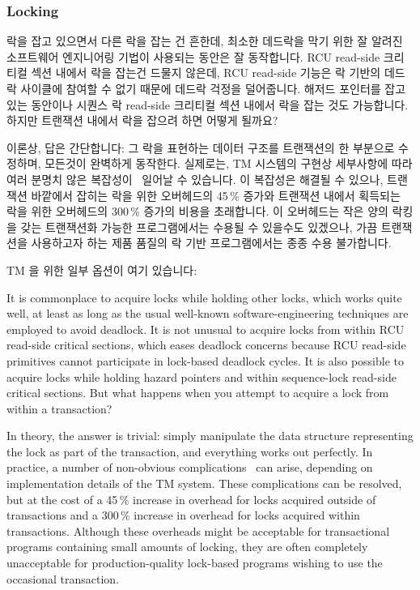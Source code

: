 \subsubsection{Locking}
\label{sec:future:Locking}

락을 잡고 있으면서 다른 락을 잡는 건 흔한데, 최소한 데드락을 막기 위한 잘
알려진 소프트웨어 엔지니어링 기법이 사용되는 동안은 잘 동작합니다.
RCU read-side 크리티컬 섹션 내에서 락을 잡는건 드물지 않은데, RCU read-side
기능은 락 기반의 데드락 사이클에 참여할 수 없기 때문에 데드락 걱정을
덜어줍니다.
해저드 포인터를 잡고 있는 동안이나 시퀀스 락 read-side 크리티컬 섹션 내에서
락을 잡는 것도 가능합니다.
하지만 트랜잭션 내에서 락을 잡으려 하면 어떻게 될까요?

이론상, 답은 간단합니다: 그 락을 표현하는 데이터 구조를 트랜잭션의 한 부분으로
수정하며, 모든것이 완벽하게 동작한다.
실제로는, TM 시스템의 구현상 세부사항에 따라 여러 분명치 않은
복잡성이~\cite{Volos2008TRANSACT} 일어날 수 있습니다.
이 복잡성은 해결될 수 있으나, 트랜잭션 바깥에서 잡히는 락을 위한 오버헤드의
45\,\% 증가와 트랜잭션 내에서 획득되는 락을 위한 오버헤드의 300\,\% 증가의
비용을 초래합니다.
이 오버헤드는 작은 양의 락킹을 갖는 트랜잭션화 가능한 프로그램에서는 수용될 수
있을수도 있겠으나, 가끔 트랜잭션을 사용하고자 하는 제품 품질의 락 기반
프로그램에서는 종종 수용 불가합니다.

TM 을 위한 일부 옵션이 여기 있습니다:

\iffalse

It is commonplace to acquire locks while holding other locks, which works
quite well, at least as long as the usual well-known software-engineering
techniques are employed to avoid deadlock.
It is not unusual to acquire locks from within RCU read-side critical
sections, which eases deadlock concerns because RCU read-side primitives
cannot participate in lock-based deadlock cycles.
It is also possible to acquire locks while holding hazard pointers and
within sequence-lock read-side critical sections.
But what happens when you attempt to acquire a lock from within a transaction?

In theory, the answer is trivial: simply manipulate the data structure
representing the lock as part of the transaction, and everything works
out perfectly.
In practice, a number of non-obvious complications~\cite{Volos2008TRANSACT}
can arise, depending on implementation details of the TM system.
These complications can be resolved, but at the cost of a 45\,\% increase in
overhead for locks acquired outside of transactions and a 300\,\% increase
in overhead for locks acquired within transactions.
Although these overheads might be acceptable for transactional
programs containing small amounts of locking, they are often completely
unacceptable for production-quality lock-based programs wishing to use
the occasional transaction.

